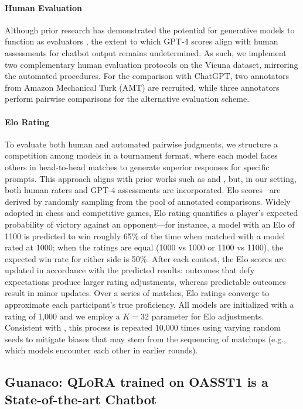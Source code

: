 \paragraph{Human Evaluation} Although prior research has demonstrated the potential for generative models to function as evaluators \citep{fu2023gptscore}, the extent to which GPT-4 scores align with human assessments for chatbot output remains undetermined. As such, we implement two complementary human evaluation protocols on the Vicuna dataset, mirroring the automated procedures. For the comparison with ChatGPT, two annotators from Amazon Mechanical Turk (AMT) are recruited, while three annotators perform pairwise comparisons for the alternative evaluation scheme.

\paragraph{Elo Rating} To evaluate both human and automated pairwise judgments, we structure a competition among models in a tournament format, where each model faces others in head-to-head matches to generate superior responses for specific prompts. This approach aligns with prior works such as \citet{bai2022training} and \citet{vicuna2023}, but, in our setting, both human raters and GPT-4 assessments are incorporated. Elo scores~\citep{elo1967proposed,elo1978rating} are derived by randomly sampling from the pool of annotated comparisons. Widely adopted in chess and competitive games, Elo rating quantifies a player's expected probability of victory against an opponent—for instance, a model with an Elo of 1100 is predicted to win roughly 65\% of the time when matched with a model rated at 1000; when the ratings are equal (1000 vs 1000 or 1100 vs 1100), the expected win rate for either side is 50\%. After each contest, the Elo scores are updated in accordance with the predicted results: outcomes that defy expectations produce larger rating adjustments, whereas predictable outcomes result in minor updates. Over a series of matches, Elo ratings converge to approximate each participant's true proficiency. All models are initialized with a rating of 1,000 and we employ a $K=32$ parameter for Elo adjustments. Consistent with \citet{vicuna2023}, this process is repeated 10,000 times using varying random seeds to mitigate biases that may stem from the sequencing of matchups (e.g., which models encounter each other in earlier rounds).

\subsection{\textbf{Guanaco}: \textsc{QLoRA} trained on OASST1 is a State-of-the-art Chatbot}


